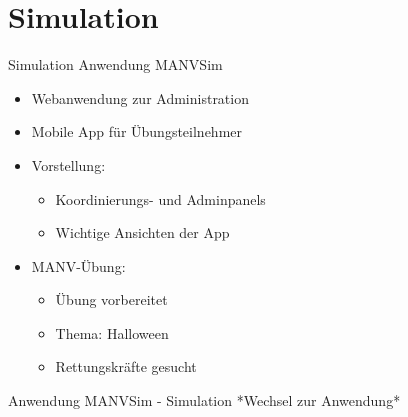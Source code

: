 
\section{Simulation}

\begin{frame}{Simulation}
	Anwendung MANVSim
	\begin{itemize}
		\item Webanwendung zur Administration
		\item Mobile App für Übungsteilnehmer
		\item Vorstellung:
		\begin{itemize}
			\item Koordinierungs- und Adminpanels
			\item Wichtige Ansichten der App
		\end{itemize}
		\item MANV-Übung:
		\begin{itemize}
			\item Übung vorbereitet
			\item Thema: Halloween
			\item Rettungskräfte gesucht
		\end{itemize}
	\end{itemize}
\end{frame}

\begin{frame}{Anwendung MANVSim - Simulation}
	*Wechsel zur Anwendung*
\end{frame}
